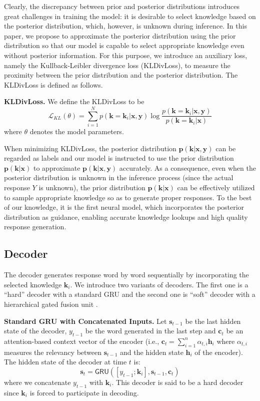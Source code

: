\documentclass{article}
\begin{document}
Clearly, the discrepancy between prior and posterior distributions
introduces great challenges in training the model:
it is desirable to select knowledge based on the posterior distribution,
which, however, is unknown during inference.
In this paper,
we propose to approximate the posterior distribution using the prior distribution 
so that our model is capable to select appropriate knowledge even without posterior information.
For this purpose,
we introduce an auxiliary loss, namely the  Kullback-Leibler divergence loss (KLDivLoss), 
to measure the proximity between the prior distribution and the posterior distribution.
The KLDivLoss is defined as follows.


\smallskip
\noindent
\textbf{KLDivLoss.}
We define the KLDivLoss to be 
$$\mathcal{L}_{KL}(\theta)  = \sum_{i=1}^N p(\mathbf{k} = \mathbf{k}_i|\mathbf{x}, \mathbf{y}) \log \frac{p(\mathbf{k} = \mathbf{k}_i|\mathbf{x}, \mathbf{y})}{p(\mathbf{k} = \mathbf{k}_i|\mathbf{x})}$$
where $\theta$ denotes the model parameters.

When minimizing KLDivLoss,
the posterior distribution $\mathbf{p}(\mathbf{k}|\mathbf{x}, \mathbf{y})$ can be regarded as labels
and our model is instructed to use the prior distribution $\mathbf{p}(\mathbf{k}|\mathbf{x})$ to approximate $\mathbf{p}(\mathbf{k}|\mathbf{x}, \mathbf{y})$ accurately.
As a consequence,
even when the posterior distribution is unknown in the inference process
(since the actual response $Y$ is unknown),
the prior distribution $\mathbf{p}(\mathbf{k}|\mathbf{x})$ can be effectively utilized to sample appropriate knowledge so as to generate proper responses.
To the best of our knowledge, it is the first neural model, 
which incorporates the posterior distribution as guidance,
enabling accurate knowledge lookups and high quality response generation.

\subsection{Decoder}
\label{subsec:decoder}
The decoder generates response word by word sequentially 
by incorporating the selected knowledge $\mathbf{k}_i$.
We introduce two variants of decoders.
The first one is a ``hard'' decoder with a standard GRU
and the second one is ``soft'' decoder with a hierarchical gated fusion unit \cite{yao2017towards}.

\smallskip
\noindent
\textbf{Standard GRU with Concatenated Inputs.}
Let $\mathbf{s}_{t-1}$ be the last hidden state of the decoder, $y_{t-1}$ be the word generated in the last step
and $\mathbf{c}_t$ be an attention-based context vector of the encoder
(i.e., $\mathbf{c}_t = \sum_{i=1}^n \alpha_{t,i} \mathbf{h}_i$ where $\alpha_{t,i}$ measures the relevancy between $\mathbf{s}_{t-1}$ and the hidden state $\mathbf{h}_i$ of the encoder).
The hidden state of the decoder at time $t$ is:
$$
    \mathbf{s}_t = \mathsf{GRU}([y_{t-1}; \mathbf{k}_i], \mathbf{s}_{t-1}, \mathbf{c}_t)
$$
where we concatenate $y_{t-1}$ with $\mathbf{k}_i$.
This decoder is said to be a hard decoder since
$\mathbf{k}_i$ is forced to participate in decoding.
\end{document}
